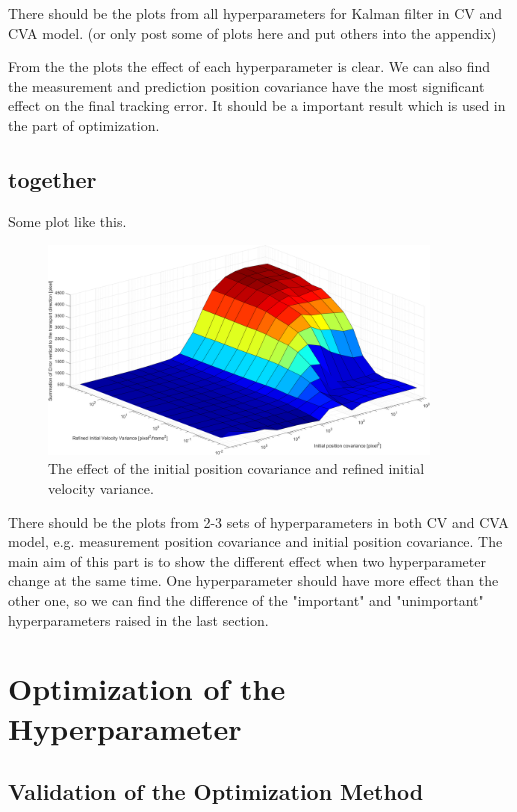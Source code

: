 There should be the plots from all hyperparameters for Kalman filter in CV and CVA model. (or only post some of plots here and put others into the appendix)

From the the plots the effect of each hyperparameter is clear. We can also find the measurement and prediction position covariance have the most significant effect on the final tracking error. It should be a important result which is used in the part of optimization. 

\subsection{together}

Some plot like this.

\begin{figure}[htbp]
\centering
\includegraphics[width=0.9\textwidth]{figures/KF/inicov-inirv.png}
\caption{The effect of the initial position covariance and refined initial velocity variance.}
\label{inicov-iniv}
\end{figure}

There should be the plots from 2-3 sets of hyperparameters in both CV and CVA model, e.g. measurement position covariance and initial position covariance. The main aim of this part is to show the different effect when two hyperparameter change at the same time. One hyperparameter should have more effect than the other one, so we can find the difference of the "important" and "unimportant" hyperparameters raised in the last section.

\section{Optimization of the Hyperparameter}
\subsection{Validation of the Optimization Method}

